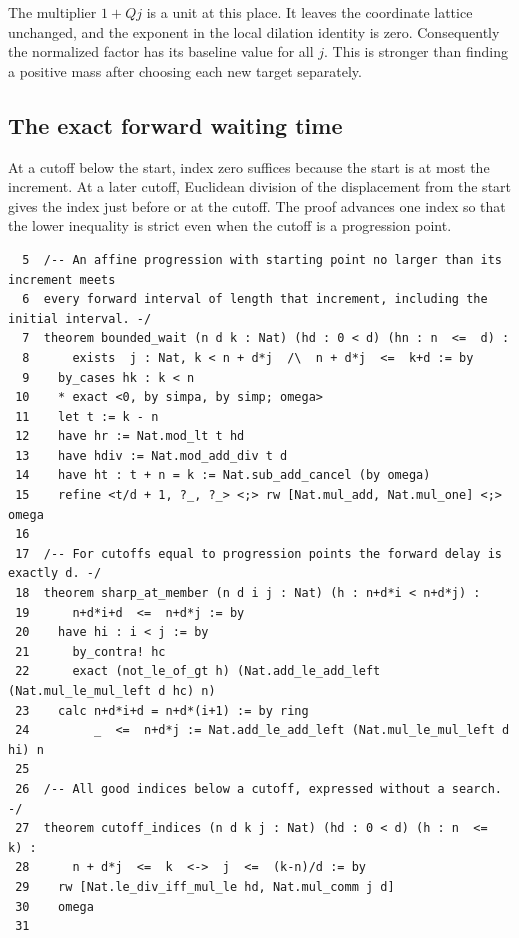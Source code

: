 \documentclass[12pt,letterpaper]{article}
\begin{document}
The multiplier $1+Qj$ is a unit at this place. It leaves the coordinate lattice unchanged, and the exponent in the local dilation identity is zero. Consequently the normalized factor has its baseline value for all $j$. This is stronger than finding a positive mass after choosing each new target separately.
\clearpage{}\subsection*{The exact forward waiting time}\label{extract-ProgressionGeometry5}
At a cutoff below the start, index zero suffices because the start is at most the increment. At a later cutoff, Euclidean division of the displacement from the start gives the index just before or at the cutoff. The proof advances one index so that the lower inequality is strict even when the cutoff is a progression point.
\par
{\fontsize{9.2}{11.2}\selectfont\begin{verbatim}
  5  /-- An affine progression with starting point no larger than its increment meets
  6  every forward interval of length that increment, including the initial interval. -/
  7  theorem bounded_wait (n d k : Nat) (hd : 0 < d) (hn : n  <=  d) :
  8      exists  j : Nat, k < n + d*j  /\  n + d*j  <=  k+d := by
  9    by_cases hk : k < n
 10    * exact <0, by simpa, by simp; omega>
 11    let t := k - n
 12    have hr := Nat.mod_lt t hd
 13    have hdiv := Nat.mod_add_div t d
 14    have ht : t + n = k := Nat.sub_add_cancel (by omega)
 15    refine <t/d + 1, ?_, ?_> <;> rw [Nat.mul_add, Nat.mul_one] <;> omega
 16
 17  /-- For cutoffs equal to progression points the forward delay is exactly d. -/
 18  theorem sharp_at_member (n d i j : Nat) (h : n+d*i < n+d*j) :
 19      n+d*i+d  <=  n+d*j := by
 20    have hi : i < j := by
 21      by_contra! hc
 22      exact (not_le_of_gt h) (Nat.add_le_add_left (Nat.mul_le_mul_left d hc) n)
 23    calc n+d*i+d = n+d*(i+1) := by ring
 24         _  <=  n+d*j := Nat.add_le_add_left (Nat.mul_le_mul_left d hi) n
 25
 26  /-- All good indices below a cutoff, expressed without a search. -/
 27  theorem cutoff_indices (n d k j : Nat) (hd : 0 < d) (h : n  <=  k) :
 28      n + d*j  <=  k  <->  j  <=  (k-n)/d := by
 29    rw [Nat.le_div_iff_mul_le hd, Nat.mul_comm j d]
 30    omega
 31
\end{verbatim}}
\end{document}
